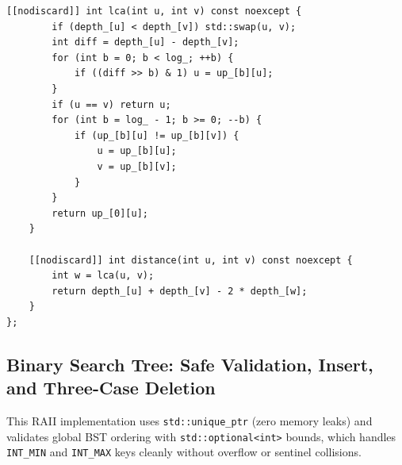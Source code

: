 \documentclass[11pt,a4paper]{article}
\theoremstyle{definition}
\begin{document}
\begin{lstlisting}[caption={Iterative-build Binary Lifting class supporting LCA, path distance, and $k$-th ancestor.}]
    [[nodiscard]] int lca(int u, int v) const noexcept {
        if (depth_[u] < depth_[v]) std::swap(u, v);
        int diff = depth_[u] - depth_[v];
        for (int b = 0; b < log_; ++b) {
            if ((diff >> b) & 1) u = up_[b][u];
        }
        if (u == v) return u;
        for (int b = log_ - 1; b >= 0; --b) {
            if (up_[b][u] != up_[b][v]) {
                u = up_[b][u];
                v = up_[b][v];
            }
        }
        return up_[0][u];
    }

    [[nodiscard]] int distance(int u, int v) const noexcept {
        int w = lca(u, v);
        return depth_[u] + depth_[v] - 2 * depth_[w];
    }
};
\end{lstlisting}

\subsection{Binary Search Tree: Safe Validation, Insert, and Three-Case Deletion}

This RAII implementation uses \texttt{std::unique\_ptr} (zero memory leaks) and validates global BST ordering with \texttt{std::optional<int>} bounds, which handles \texttt{INT\_MIN} and \texttt{INT\_MAX} keys cleanly without overflow or sentinel collisions.
\end{document}
